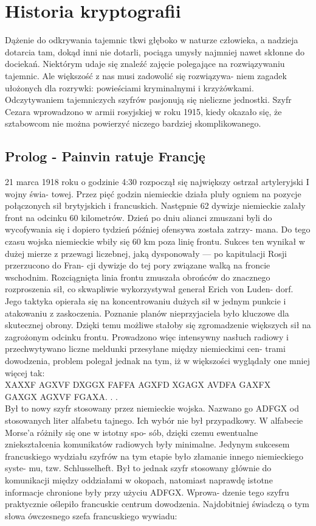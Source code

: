 \documentclass[a4paper]{article}
\begin{document}
\section{Historia kryptografii}
Dążenie do odkrywania tajemnic tkwi głęboko w naturze człowieka, a nadzieja dotarcia tam, dokąd
inni nie dotarli, pociąga umysły najmniej nawet skłonne do dociekań. Niektórym udaje się znaleźć
zajęcie polegające na rozwiązywaniu tajemnic. Ale większość z nas musi zadowolić się rozwiązywa-
niem zagadek ułożonych dla rozrywki: powieściami kryminalnymi i krzyżówkami. Odczytywaniem
tajemniczych szyfrów pasjonują się nieliczne jednostki.
Szyfr Cezara wprowadzono w armii rosyjskiej w roku 1915, kiedy okazało się, że sztabowcom nie
można powierzyć niczego bardziej skomplikowanego.
\subsection{Prolog - Painvin ratuje Francję}
21 marca 1918 roku o godzinie 4:30 rozpoczął się największy ostrzał artyleryjski I wojny świa-
towej. Przez pięć godzin niemieckie działa pluły ogniem na pozycje połączonych sił brytyjskich
i francuskich. Następnie 62 dywizje niemieckie zalały front na odcinku 60 kilometrów. Dzień po
dniu alianci zmuszani byli do wycofywania się i dopiero tydzień później ofensywa została zatrzy-
mana. Do tego czasu wojska niemieckie wbiły się 60 km poza linię frontu. Sukces ten wynikał w
dużej mierze z przewagi liczebnej, jaką dysponowały — po kapitulacji Rosji przerzucono do Fran-
cji dywizje do tej pory związane walką na froncie wschodnim. Rozciągnięta linia frontu zmuszała
obrońców do znacznego rozproszenia sił, co skwapliwie wykorzystywał generał Erich von Luden-
dorf. Jego taktyka opierała się na koncentrowaniu dużych sił w jednym punkcie i atakowaniu z
zaskoczenia. Poznanie planów nieprzyjaciela było kluczowe dla skutecznej obrony. Dzięki temu
możliwe stałoby się zgromadzenie większych sił na zagrożonym odcinku frontu. Prowadzono więc
intensywny nasłuch radiowy i przechwytywano liczne meldunki przesyłane między niemieckimi cen-
trami dowodzenia, problem polegał jednak na tym, iż w większości wyglądały one mniej więcej tak:\\

XAXXF AGXVF DXGGX FAFFA AGXFD XGAGX AVDFA GAXFX\\
\indent GAXGX AGXVF FGAXA. . .\\

\noindent Był to nowy szyfr stosowany przez niemieckie wojska. Nazwano go ADFGX od stosowanych liter
alfabetu tajnego. Ich wybór nie był przypadkowy. W alfabecie Morse’a różniły się one w istotny spo-
sób, dzięki czemu ewentualne zniekształcenia komunikatów radiowych były minimalne. Jedynym
sukcesem francuskiego wydziału szyfrów na tym etapie było złamanie innego niemieckiego syste-
mu, tzw. Schlusselheft. Był to jednak szyfr stosowany głównie do komunikacji między oddziałami
w okopach, natomiast naprawdę istotne informacje chronione były przy użyciu ADFGX. Wprowa-
dzenie tego szyfru praktycznie oślepiło francuskie centrum dowodzenia. Najdobitniej świadczą o
tym słowa ówczesnego szefa francuskiego wywiadu:
\end{document}

